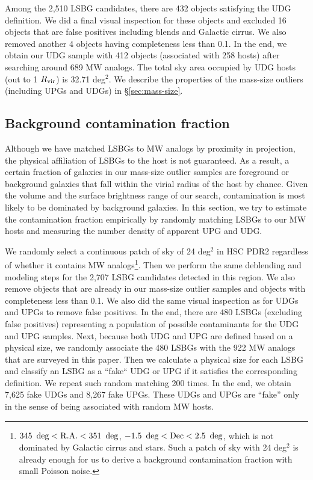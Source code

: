 \documentclass[twocolumn,astrosymb,twocolappendix,linenumbers]{aastex631}
\begin{document}
\begin{CJK*}{UTF8}{gbsn}
Among the 2,510 LSBG candidates, there are 432 objects satisfying the UDG definition. We did a final visual inspection for these objects and excluded 16 objects that are false positives including blends and Galactic cirrus. We also removed another 4 objects having completeness less than 0.1. In the end, we obtain our UDG sample with 412 objects (associated with 258 hosts) after searching around 689 MW analogs. The total sky area occupied by UDG hosts (out to 1 $R_{\rm{vir}}$) is 32.71 deg$^{2}$. We describe the properties of the mass-size outliers (including UPGs and UDGs) in \S\ref{sec:mass-size}.

\subsection{Background contamination fraction}\label{sec:bkg}
Although we have matched LSBGs to MW analogs by proximity in projection, the physical affiliation of LSBGs to the host is not guaranteed. As a result, a certain fraction of galaxies in our mass-size outlier samples are foreground or background galaxies that fall within the virial radius of the host by chance. Given the volume and the surface brightness range of our search, contamination is most likely to be dominated by background galaxies. In this section, we try to estimate the contamination fraction empirically by randomly matching LSBGs to our MW hosts and measuring the number density of apparent UPG and UDG.

We randomly select a continuous patch of sky of 24 deg$^{2}$ in HSC PDR2 regardless of whether it contains MW analogs\footnote{$345\ \deg < \rm{R.A.} < 351\ \deg$, $-1.5\ \deg < \rm{Dec} < 2.5\ \deg$, which is not dominated by Galactic cirrus and stars. Such a patch of sky with 24 deg$^2$ is already enough for us to derive a background contamination fraction with small Poisson noise.}. Then we perform the same deblending and modeling steps for the 2,707 LSBG candidates detected in this region. We also remove objects that are already in our mass-size outlier samples and objects with completeness less than 0.1. We also did the same visual inspection as for UDGs and UPGs to remove false positives. In the end, there are 480 LSBGs (excluding false positives) representing a population of possible contaminants for the UDG and UPG samples. Next, because both UDG and UPG are defined based on a physical size, we randomly associate the 480 LSBGs with the 922 MW analogs that are surveyed in this paper. Then we calculate a physical size for each LSBG and classify an LSBG as a ``fake`` UDG or UPG if it satisfies the corresponding definition. We repeat such random matching 200 times. In the end, we obtain 7,625 fake UDGs and 8,267 fake UPGs. These UDGs and UPGs are ``fake'' only in the sense of being associated with random MW hosts. 


\end{CJK*}
\end{document}
